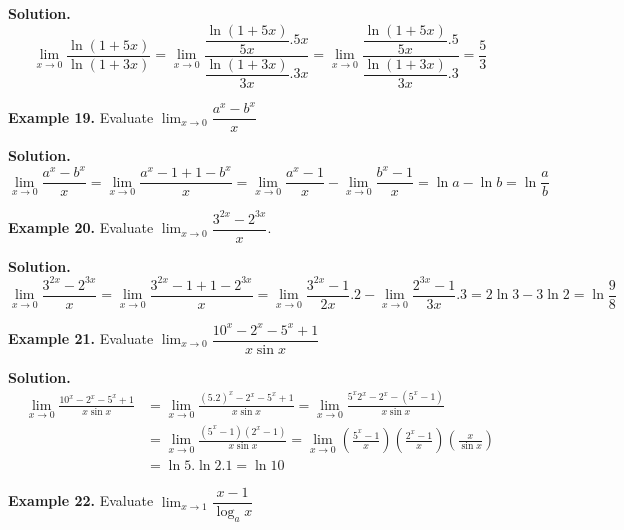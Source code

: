 \documentclass[../../main.tex]{subfiles}
\begin{document}
\textbf{Solution.} 
\begin{equation*}
    \lim_{x\rightarrow 0}\frac{\ln(1+5x)}{\ln(1+3x)} = \lim_{x\rightarrow 0}\frac{\dfrac{\ln(1+5x)}{5x}.5x}{\dfrac{\ln(1+3x)}{3x}.3x} = \lim_{x\rightarrow 0}\frac{\dfrac{\ln(1+5x)}{5x}.5}{\dfrac{\ln(1+3x)}{3x}.3} = \frac{5}{3}
\end{equation*}

\vspace{0.2cm}
\textbf{Example 19.}
\vspace{0.2cm}
Evaluate $\lim_{x\rightarrow 0}\dfrac{a^x-b^x}{x}$

\textbf{Solution.} 
\begin{equation*}
    \lim_{x\rightarrow 0}\frac{a^x-b^x}{x} = \lim_{x\rightarrow 0}\frac{a^x-1+1-b^x}{x} = \lim_{x\rightarrow 0}\frac{a^x-1}{x}-\lim_{x\rightarrow 0}\frac{b^x-1}{x} = \ln a - \ln b = \ln \frac{a}{b}
\end{equation*}

\vspace{0.2cm}
\textbf{Example 20.}
\vspace{0.2cm}
Evaluate $\lim_{x\rightarrow 0}\dfrac{3^{2x}-2^{3x}}{x}$.

\textbf{Solution.} 
\begin{equation*}
    \lim_{x\rightarrow 0}\frac{3^{2x}-2^{3x}}{x}=\lim_{x\rightarrow 0}\frac{3^{2x}-1+1-2^{3x}}{x} = \lim_{x\rightarrow 0}\frac{3^{2x}-1}{2x}.2-\lim_{x\rightarrow 0}\frac{2^{3x}-1}{3x}.3 = 2\ln 3 - 3\ln 2 = \ln \frac{9}{8}
\end{equation*}

\vspace{0.2cm}
\textbf{Example 21.}
\vspace{0.2cm}
Evaluate $\lim_{x\rightarrow 0}\dfrac{10^x-2^x-5^x+1}{x \sin x}$

\textbf{Solution.} 
\begin{align*}
    \lim_{x\rightarrow 0}\frac{10^x-2^x-5^x+1}{x\sin x} &= \lim_{x\rightarrow 0}\frac{(5.2)^x-2^x-5^x+1}{x \sin x} = \lim_{x\rightarrow 0}\frac{5^x2^x-2^x-(5^x-1)}{x \sin x} \\
    &= \lim_{x\rightarrow 0}\frac{(5^x-1)(2^x-1)}{x \sin x} = \lim_{x\rightarrow 0}(\frac{5^x-1}{x})(\frac{2^x-1}{x})(\frac{x}{\sin x}) \\
    &= \ln 5.\ln 2. 1 = \ln 10
\end{align*}


\vspace{0.2cm}
\textbf{Example 22.}
\vspace{0.2cm}
Evaluate $\lim_{x\rightarrow 1}\dfrac{x-1}{\log_a x}$
\end{document}
